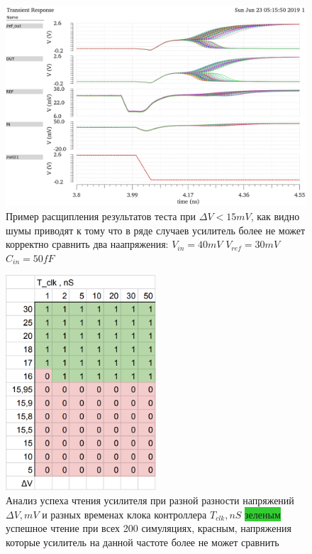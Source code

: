 \documentclass[a4paper,12pt]{article} %
\begin{document}
\begin{figure}
  \begin{center}
    \includegraphics[width=0.8\linewidth]{fail.png}
  \end{center}
  \caption{Пример расщипления результатов теста при $ \Delta V <15mV $, как видно шумы приводят к тому что в ряде случаев усилитель более не может корректно сравнить два наапряжения: $V_{in}=40mV $ $ V_{ref}=30mV $ $C_{in}=50fF $}
  \label{pic:fail}
\end{figure}





   \begin{figure}[H]
   \centering
  \includegraphics[width=0.5\textwidth]{shmoo.png}
  \caption{Анализ успеха чтения усилителя при разной разности напряжений $\Delta V , mV $ и разных временах клока контроллера $T_{clk}, nS$ \colorbox{LimeGreen}{зеленым} успешное чтение при всех 200 симуляциях, \colorbox{BrickRed}{красным}, напряжения которые усилитель на данной частоте более не может сравнить}
  \label{pic:shmoo}
  \end{figure}
\end{document}
